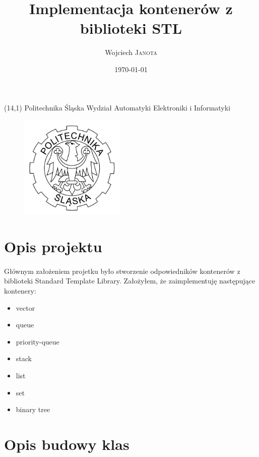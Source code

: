 \documentclass{article}
\begin{document}
\title{Implementacja kontenerów z biblioteki STL} %

\author{Wojciech \textsc{Janota}} %

\date{\today} %

\maketitle %

\begin{textblock}{5}(14,1)
\noindent\Large Politechnika Śląska \newline
\noindent Wydział Automatyki Elektroniki i Informatyki
\end{textblock}
\begin{figure}[h!]
  \centering
  \includegraphics[width=5cm]{LOGO}
\end{figure}
\newpage{}
\section{Opis projektu}
\paragraph{}
Głównym założeniem projetku było stworzenie odpowiedników kontenerów \newline z biblioteki Standard Template Library.
Założyłem, że zaimplementuję następujące kontenery:
\begin{itemize}
  \item vector
  \item queue
  \item priority-queue
  \item stack
  \item list
  \item set
  \item binary tree
\end{itemize}

\section{Opis budowy klas}
\end{document}
